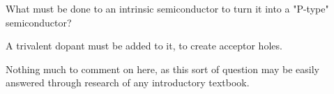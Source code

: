 

What must be done to an intrinsic semiconductor to turn it into a "P-type" semiconductor?







A trivalent dopant must be added to it, to create acceptor holes.







Nothing much to comment on here, as this sort of question may be easily answered through research of any introductory textbook.




